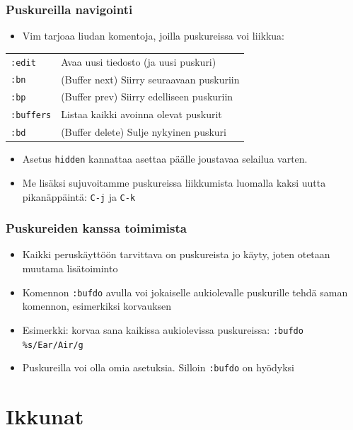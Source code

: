 \documentclass[]{beamer}
\newcommand{\Tohj}[1]{\texttt{#1}}
\newcommand{\com}[1]{{\color{blue!50!black}\Tohj{#1}} \!\!}
\newcommand{\set}[1]{\texttt{#1}}
\begin{document}
\begin{frame}
    \frametitle{Puskureilla navigointi}
    \begin{itemize}
        \item Vim tarjoaa liudan komentoja, joilla puskureissa voi liikkua:
    \end{itemize}
    \begin{tabular}{ll}
    \com{:edit} & Avaa uusi tiedosto (ja uusi puskuri) \\
    \com{:bn} & (Buffer next) Siirry seuraavaan puskuriin \\
    \com{:bp} & (Buffer prev) Siirry edelliseen puskuriin \\
    \com{:buffers} & Listaa kaikki avoinna olevat puskurit\\
    \com{:bd} & (Buffer delete) Sulje nykyinen puskuri \\
    \end{tabular}
    \begin{itemize}
        \item Asetus \set{hidden} kannattaa asettaa päälle joustavaa selailua varten.
        \pause
        \item Me lisäksi sujuvoitamme puskureissa liikkumista luomalla kaksi uutta pikanäppäintä: \com{C-j} ja \com{C-k} 
    \end{itemize}
\end{frame}

\begin{frame}
    \frametitle{Puskureiden kanssa toimimista}
    \begin{itemize}
        \item Kaikki peruskäyttöön tarvittava on puskureista jo käyty, joten otetaan muutama lisätoiminto
        \item Komennon \com{:bufdo} avulla voi jokaiselle aukiolevalle puskurille tehdä saman komennon, esimerkiksi korvauksen
        \pause
        \item Esimerkki: korvaa sana kaikissa aukiolevissa puskureissa: \com{:bufdo \%s/Ear/Air/g}
        \pause
        \item Puskureilla voi olla omia asetuksia. Silloin \com{:bufdo} on hyödyksi
    \end{itemize}
\end{frame}

\section {Ikkunat}
\end{document}
